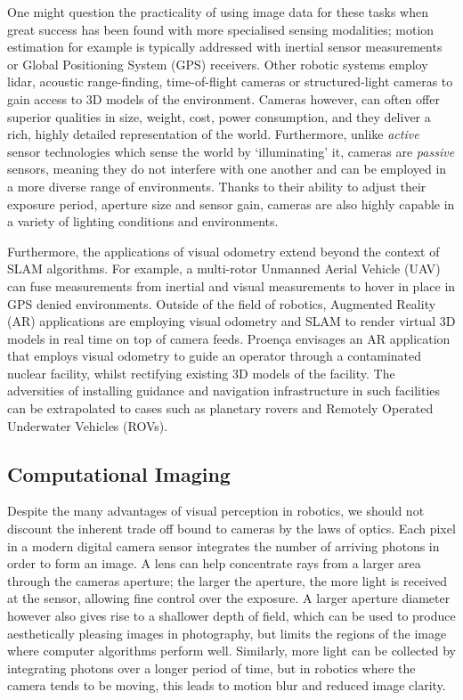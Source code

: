One might question the practicality of using image data for these tasks when great success has been found with more specialised sensing modalities; motion estimation for example is typically addressed with inertial sensor measurements or Global Positioning System (GPS) receivers. Other robotic systems employ lidar, acoustic range-finding, time-of-flight cameras or structured-light cameras to gain access to 3D models of the environment. Cameras however, can often offer superior qualities in size, weight, cost, power consumption, and they deliver a rich, highly detailed representation of the world. Furthermore, unlike \textit{active} sensor technologies which sense the world by `illuminating' it, cameras are \textit{passive} sensors, meaning they do not interfere with one another and can be employed in a more diverse range of environments. Thanks to their ability to adjust their exposure period, aperture size and sensor gain, cameras are also highly capable in a variety of lighting conditions and environments. 

Furthermore, the applications of visual odometry extend beyond the context of SLAM algorithms. For example, a multi-rotor Unmanned Aerial Vehicle (UAV) can fuse measurements from inertial and visual measurements to hover in place in GPS denied environments. Outside of the field of robotics, Augmented Reality (AR) applications are employing visual odometry and SLAM to render virtual 3D models in real time on top of camera feeds. Proença \cite{proenca2018rgbd} envisages an AR application that employs visual odometry to guide an operator through a contaminated nuclear facility, whilst rectifying existing 3D models of the facility. The adversities of installing guidance and navigation infrastructure in such facilities can be extrapolated to cases such as planetary rovers and Remotely Operated Underwater Vehicles (ROVs).


\subsection{Computational Imaging}

Despite the many advantages of visual perception in robotics, we should not discount the inherent trade off bound to cameras by the laws of optics. Each pixel in a modern digital camera sensor integrates the number of arriving photons in order to form an image. A lens can help concentrate rays from a larger area through the cameras aperture; the larger the aperture, the more light is received at the sensor, allowing fine control over the exposure. A larger aperture diameter however also gives rise to a shallower depth of field, which can be used to produce aesthetically pleasing images in photography, but limits the regions of the image where computer algorithms perform well. Similarly, more light can be collected by integrating photons over a longer period of time, but in robotics where the camera tends to be moving, this leads to motion blur and reduced image clarity.

